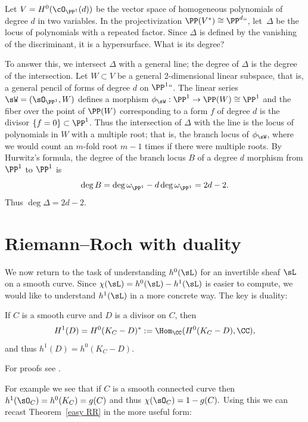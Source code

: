 \begin{example}
Let 
$V= H^0(\cO_{\PP^1}(d))$
be the vector space of  homogeneous polynomials of degree $d$ in
two variables. In the
projectivization $\PP(V^{*}) \cong \PP^d` `$, let~$\Delta$ be the
locus of polynomials with a repeated factor. Since $\Delta$ is
defined by the vanishing of the discriminant, it is a hypersurface.
What is its degree? 
 
To answer this, we intersect $\Delta$ with a general line; the degree
of $\Delta$ is the degree of the intersection.  Let $W\subset V$ be a
general 2-dimensional linear subspace, that is, a general pencil of
forms of degree $d$ on $\PP^1` `$. The linear series $\sW =
(\sO_{\PP^{1}}, W)$ defines a morphism $\phi_{\sW} : \PP^{1} \to
\PP(W) \cong \PP^{1}$ and the fiber over the point of $\PP(W)$
corresponding to a form $f$ of degree $d$ is the divisor $\{f =
0\}\subset \PP^{1}$. Thus the intersection of $\Delta$ with the line
is the locus of polynomials in $W$ with a multiple root; that is, the
branch locus of $\phi_{\sW}$, where we would count an $m$-fold root
$m-1$ times if there were multiple roots. 
 By Hurwitz's formula, the degree of the branch locus $B$ of a 
degree $d$ morphism from $\PP^{1}$ to $\PP^{1}$ is
 $$
 \deg B = \deg \omega^{}_{\PP^{1}} - d\deg \omega^{}_{\PP^{1}} = 2d-2.
 $$
 Thus $\deg \Delta = 2d-2$.
 \end{example}
  

\section{Riemann--Roch with duality}

We now return to the task of understanding $h^0(\sL)$ for an invertible sheaf $\sL$ on a smooth curve. Since $\chi(\sL) = h^0(\sL)-h^1(\sL)$ is easier to compute, we would like to understand $h^1(\sL)$ in a more concrete way. The key is duality:
 
\begin{theorem}\label{sd}
If $C$ is a smooth curve and $D$ is a divisor on $C$, then
%
%
%
$$
H^1(D) =H^0(K_C-D)^* := \Hom_\CC(H^0(K_C-D), \CC),
$$
and thus $h^1(D) = h^0(K_C-D)$.
\end{theorem}

For proofs see \cite[Theorem III.5.2 and III.7.6]{Hartshorne1977}. 

For example we see that if $C$ is a smooth connected curve then $h^1 (\sO_C) = h^0(K_C) = g(C)$ and thus $\chi(\sO_C) = 1-g(C).$   
Using this we can recast Theorem~\ref{easy RR}
in the more useful form:

